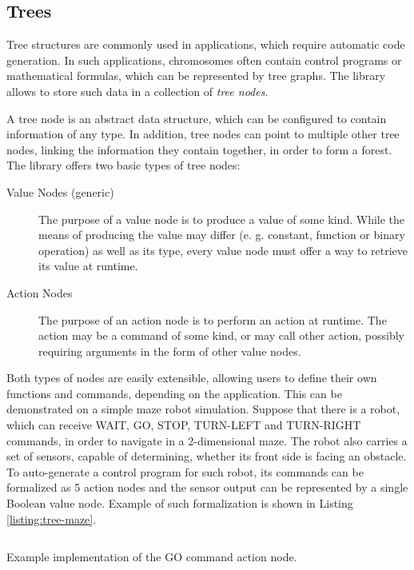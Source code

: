 \subsection{Trees}
Tree structures are commonly used in applications, which require automatic code generation. In such applications, chromosomes often contain control programs or mathematical formulas, which can be represented by tree graphs. The library allows to store such data in a collection of \textit{tree nodes}.

A tree node is an abstract data structure, which can be configured to contain information of any type. In addition, tree nodes can point to multiple other tree nodes, linking the information they contain together, in order to form a forest. The library offers two basic types of tree nodes:
~
\begin{description}
	\item[Value Nodes (generic)]
	The purpose of a value node is to produce a value of some kind. While the means of producing the value may differ (e. g. constant, function or binary operation) as well as its type, every value node must offer a way to retrieve its value at runtime.

	\item[Action Nodes]
	The purpose of an action node is to perform an action at runtime. The action may be a command of some kind, or may call other action, possibly requiring arguments in the form of other value nodes.
\end{description}

Both types of nodes are easily extensible, allowing users to define their own functions and commands, depending on the application. This can be demonstrated on a simple maze robot simulation. Suppose that there is a robot, which can receive WAIT, GO, STOP, TURN-LEFT and TURN-RIGHT commands, in order to navigate in a 2-dimensional maze. The robot also carries a set of sensors, capable of determining, whether its front side is facing an obstacle. To auto-generate a control program for such robot, its commands can be formalized as 5 action nodes and the sensor output can be represented by a single Boolean value node. Example of such formalization is shown in Listing \ref{listing:tree-maze}.

\begin{listing}[ht]
	\inputminted{swift}{../code/tree-maze.swift}
	\caption{Example implementation of the GO command action node.}
	\label{listing:tree-maze}
\end{listing}

